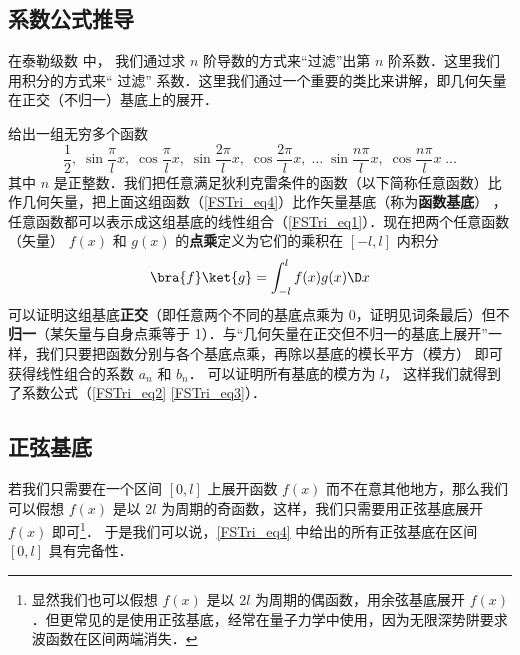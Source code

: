 \subsection{系数公式推导}

在泰勒级数 中，%
我们通过求 $n$ 阶导数的方式来“过滤”出第 $n$ 阶系数．这里我们用积分的方式来“ 过滤” 系数．这里我们通过一个重要的类比来讲解，即几何矢量在正交（不归一）基底上的展开．%

% 

给出一组无穷多个函数
\begin{equation}\label{FSTri_eq4}
\frac 12,\;   \sin\frac{\pi}{l} x,\;   \cos\frac{\pi}{l} x,\;   \sin\frac{2\pi}{l} x,\;   \cos\frac{2\pi}{l} x,\;   \dots\;\sin\frac{n\pi}{l} x,\;   \cos\frac{n\pi}{l} x\;   \dots
\end{equation}
其中 $n$ 是正整数．我们把任意满足狄利克雷条件的函数（以下简称任意函数）比作几何矢量，把上面这组函数（\autoref{FSTri_eq4}）比作矢量基底（称为\textbf{函数基底}）
，任意函数都可以表示成这组基底的线性组合（\autoref{FSTri_eq1}）．现在把两个任意函数（矢量） $f(x)$ 和 $g(x)$ 的\textbf{点乘}定义为它们的乘积在 $[-l,l]$ 内积分
\begin{equation}
\bra{f}\ket{g} = \int_{-l}^{l} f(x)g(x)\D x
\end{equation}
可以证明这组基底\textbf{正交}（即任意两个不同的基底点乘为 0，证明见词条最后）但不\textbf{归一}（某矢量与自身点乘等于 1）．与“几何矢量在正交但不归一的基底上展开”一样，我们只要把函数分别与各个基底点乘，再除以基底的模长平方（模方）
即可获得线性组合的系数 $a_n$ 和 $b_n$． 可以证明所有基底的模方为 $l$， 这样我们就得到了系数公式（\autoref{FSTri_eq2} \autoref{FSTri_eq3}）．


\subsection{正弦基底}
若我们只需要在一个区间 $[0,l]$ 上展开函数 $f(x)$ 而不在意其他地方，那么我们可以假想 $f(x)$ 是以 $2l$ 为周期的奇函数，这样，我们只需要用正弦基底展开 $f(x)$ 即可\footnote{显然我们也可以假想 $f(x)$ 是以 $2l$ 为周期的偶函数，用余弦基底展开 $f(x)$．但更常见的是使用正弦基底，经常在量子力学中使用，因为无限深势阱要求波函数在区间两端消失．}． 于是我们可以说，\autoref{FSTri_eq4} 中给出的所有正弦基底在区间 $[0,l]$ 具有完备性．


